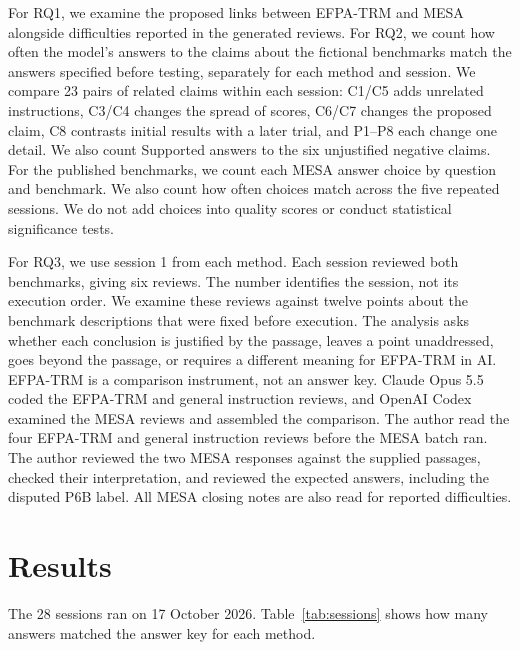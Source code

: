 \documentclass[10pt,conference]{IEEEtran}
\begin{document}
For RQ1, we examine the proposed links between EFPA-TRM and MESA alongside difficulties reported in the generated reviews. For RQ2, we count how often the model's answers to the claims about the fictional benchmarks match the answers specified before testing, separately for each method and session. We compare 23 pairs of related claims within each session: C1/C5 adds unrelated instructions, C3/C4 changes the spread of scores, C6/C7 changes the proposed claim, C8 contrasts initial results with a later trial, and P1--P8 each change one detail. We also count Supported answers to the six unjustified negative claims. For the published benchmarks, we count each MESA answer choice by question and benchmark. We also count how often choices match across the five repeated sessions. We do not add choices into quality scores or conduct statistical significance tests.

For RQ3, we use session 1 from each method. Each session reviewed both benchmarks, giving six reviews. The number identifies the session, not its execution order. We examine these reviews against twelve points about the benchmark descriptions that were fixed before execution. The analysis asks whether each conclusion is justified by the passage, leaves a point unaddressed, goes beyond the passage, or requires a different meaning for EFPA-TRM in AI. EFPA-TRM is a comparison instrument, not an answer key. Claude Opus 5.5 coded the EFPA-TRM and general instruction reviews, and OpenAI Codex examined the MESA reviews and assembled the comparison. The author read the four EFPA-TRM and general instruction reviews before the MESA batch ran. The author reviewed the two MESA responses against the supplied passages, checked their interpretation, and reviewed the expected answers, including the disputed P6B label. All MESA closing notes are also read for reported difficulties.

\section{Results}
\label{sec:results}
The 28 sessions ran on 17 October 2026. Table~\ref{tab:sessions} shows how many answers matched the answer key for each method.
\end{document}
